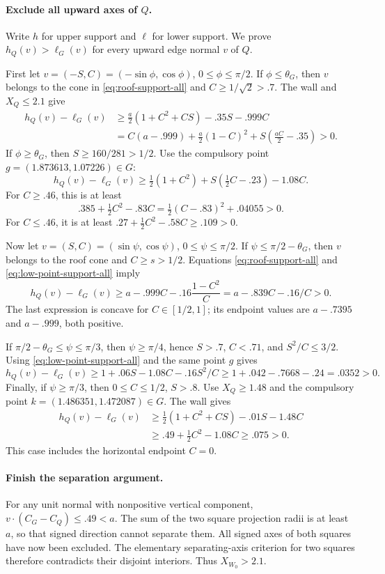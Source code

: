 \documentclass[11pt]{article}
\begin{document}
\paragraph{Exclude all upward axes of $Q$.}
Write $h$ for upper support and $\ell$ for lower support.
We prove $h_Q(v)>\ell_G(v)$ for every upward edge normal $v$ of $Q$.

First let $v=(-S,C)=(-\sin\phi,\cos\phi)$, $0\le\phi\le\pi/2$.
If $\phi\le\theta_G$, then $v$ belongs to the cone in
\eqref{eq:roof-support-all} and $C\ge1/\sqrt2>.7$.
The wall and $X_Q\le2.1$ give
\begin{align*}
 h_Q(v)-\ell_G(v)
 &\ge \frac a2(1+C^2+CS)-.35S-.999C\\
 &=C(a-.999)+\frac a2(1-C)^2
                  +S\left(\frac{aC}{2}-.35\right)>0.
\end{align*}
If $\phi\ge\theta_G$, then $S\ge160/281>1/2$.
Use the compulsory point $g=(1.873613,1.07226)\in G$:
\[
 h_Q(v)-\ell_G(v)
 \ge\tfrac12(1+C^2)+S(\tfrac12C-.23)-1.08C.
\]
For $C\ge.46$, this is at least
\[
 .385+\tfrac12C^2-.83C
       =\tfrac12(C-.83)^2+.04055>0.
\]
For $C\le.46$, it is at least
$ .27+\tfrac12C^2-.58C\ge.109>0$.

Now let $v=(S,C)=(\sin\psi,\cos\psi)$, $0\le\psi\le\pi/2$.
If $\psi\le\pi/2-\theta_G$, then $v$ belongs to the roof cone
and $C\ge s>1/2$. Equations \eqref{eq:roof-support-all} and
\eqref{eq:low-point-support-all} imply
\[
 h_Q(v)-\ell_G(v)
 \ge a-.999C-.16\frac{1-C^2}{C}
 =a-.839C-.16/C>0.
\]
The last expression is concave for $C\in[1/2,1]$; its endpoint
values are $a-.7395$ and $a-.999$, both positive.

If $\pi/2-\theta_G\le\psi\le\pi/3$, then
$\psi\ge\pi/4$, hence $S>.7$, $C<.71$, and $S^2/C\le3/2$.
Using \eqref{eq:low-point-support-all} and the same point $g$ gives
\[
 h_Q(v)-\ell_G(v)
 \ge 1+.06S-1.08C-.16S^2/C
 \ge 1+.042-.7668-.24=.0352>0.
\]
Finally, if $\psi\ge\pi/3$, then $0\le C\le1/2$, $S>.8$.
Use $X_Q\ge1.48$ and the compulsory point
$k=(1.486351,1.472087)\in G$. The wall gives
\begin{align*}
 h_Q(v)-\ell_G(v)
 &\ge\tfrac12(1+C^2+CS)-.01S-1.48C\\
 &\ge .49+\tfrac12C^2-1.08C\ge.075>0.
\end{align*}
This case includes the horizontal endpoint $C=0$.

\paragraph{Finish the separation argument.}
For any unit normal with nonpositive vertical component,
$v\cdot(C_G-C_Q)\le.49<a$. The sum of the two square projection
radii is at least $a$, so that signed direction cannot separate them.
All signed axes of both squares have now been excluded. The elementary
separating-axis criterion for two squares therefore contradicts their
disjoint interiors. Thus $X_{W_0}>2.1$.
\end{document}
